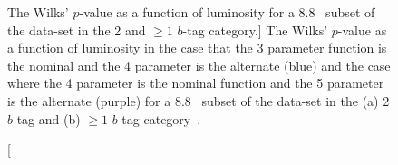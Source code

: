 \begin{figure}[!htb]
  \begin{center}
    \captionsetup[subfigure]{aboveskip=0pt,justification=centering}
  \end{center}
  \vspace{-1em}
  \caption
      [The Wilks' \mbox{$p$-value} as a function of luminosity for a 8.8~\ifb{} subset of the \summer{} data-set in the 2 and $\geq1$ $b$-tag category.]
      {The Wilks' \mbox{$p$-value} as a function of luminosity
        in the case that the 3 parameter function is the nominal and the 4 parameter is the alternate (blue)
        and the case where the 4 parameter is the nominal function and the 5 parameter is the alternate (purple)
        for a 8.8~\ifb{} subset of the \summer{} data-set in the (a) 2 $b$-tag and (b) $\geq1$ $b$-tag category~\cite{dibjet-ichep_conf}.
      }
  \label{fig:bkg-summer-wilks}
\end{figure}

